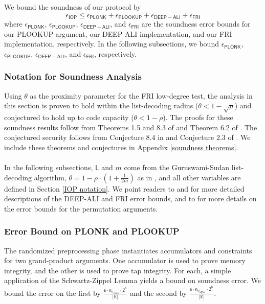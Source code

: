 \documentclass[10pt,letterpaper,titlepage]{article}
\theoremstyle{definition}
\begin{document}
We bound the soundness of our protocol by 
\[
  \epsilon_\mathsf{IOP}
    \leq
  \epsilon_\mathsf{PLONK} + 
  \epsilon_\mathsf{PLOOKUP} + 
  \epsilon_\mathsf{DEEP-ALI} + 
  \epsilon_\mathsf{FRI}
\]
where 
$\epsilon_\mathsf{PLONK}$, $\epsilon_\mathsf{PLOOKUP}$, $\epsilon_\mathsf{DEEP-ALI}$, and $\epsilon_\mathsf{FRI}$ 
are the soundness error bounds for our PLOOKUP argument, our DEEP-ALI implementation, and our FRI implementation, respectively. 
In the following subsections, we bound $\epsilon_\mathsf{PLONK}$, $\epsilon_\mathsf{PLOOKUP}$, $\epsilon_\mathsf{DEEP-ALI}$, and $\epsilon_\mathsf{FRI}$, respectively. 

\subsubsection{Notation for Soundness Analysis}
Using $\theta$ as the proximity parameter for the FRI low-degree test, the analysis in this section is proven to hold within the list-decoding radius ($\theta < 1-\sqrt{\rho}$) 
and conjectured to hold up to code capacity ($\theta < 1 - \rho$). 
The proofs for these soundness results follow from Theorems 1.5 and 8.3 of \cite{proxGaps} and Theorem 6.2 of \cite{deepFRI}. 
The conjectured security follows from Conjecture 8.4 in \cite{proxGaps} and Conjecture 2.3 of \cite{deepFRI}. 
We include these theorems and conjectures in Appendix \ref{soundness theorems}.\\
\\
In the following subsections, $\mathsf{L}$ and $m$ come from the Guruswami-Sudan list-decoding algorithm, 
$\theta=1-\rho\cdot(1+\frac{1}{2m})$ as in \cite{FRIsummary}, 
and all other variables are defined in Section \ref{IOP notation}. 
We point readers to \cite{FRIsummary} and \cite{ethSTARK} for more detailed descriptions of the DEEP-ALI and FRI error bounds, and to \cite{plonky2} for more details on the error bounds for the permutation arguments. 
\subsubsection{Error Bound on PLONK and PLOOKUP}
The randomized preprocessing phase instantiates accumulators and constraints for two grand-product arguments.
One accumulator is used to prove memory integrity, and the other is used to prove tap integrity.
For each, a simple application of the Schwartz-Zippel Lemma yields a bound on soundness error. 
We bound the error on the first by 
$\frac{\mathsf{e}\cdot\mathsf{n}_{\sigma_\mathsf{mem}}\cdot2^{\mathsf{h}}}{|\mathbb{K}|}$ 
and the second by 
$\frac{\mathsf{e}\cdot\mathsf{n}_{\sigma_\mathsf{bytes}}\cdot2^{\mathsf{h}}}{|\mathbb{K}|}$. 
\end{document}
